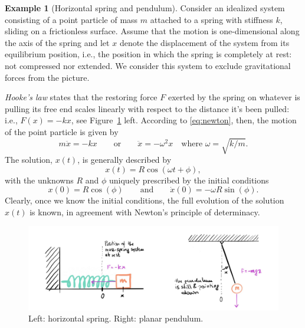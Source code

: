 \documentclass[english,fontsize=11pt,paper=b5]{scrbook}
\theoremstyle{definition}
\newtheorem{example}{Example}[chapter]
\begin{document}
  \begin{example}[Horizontal spring and pendulum]\label{ex:sprPen}
    Consider an idealized system consisting of a point particle of mass $m$ attached to a spring with stiffness $k$, sliding on a frictionless surface.
    Assume that the motion is one-dimensional along the axis of the spring and let $x$ denote the displacement of the system from its equilibrium position, i.e., the position in which the spring is completely at rest: not compressed nor extended. We consider this system to exclude gravitational forces from the picture.

    \emph{Hooke's law} states that the restoring force $F$ exerted by the spring on whatever is pulling its free end scales linearly with respect to the distance it's been pulled: i.e., $F(x) = - k x$, see Figure~\ref{fig:spring-pendulum} left. According to \eqref{eq:newton}, then, the motion of the point particle is given by
    \begin{equation}\label{eq:spring}
      m \ddot{x} = - k x \qquad\mbox{or}\qquad \ddot{x} = - \omega^2 x \quad\mbox{where } \omega = \sqrt{k/m}.
    \end{equation}
    The solution, $x(t)$, is generally described by
    \begin{equation}\label{eq:springsol}
      x(t) = R \cos(\omega t + \phi),
    \end{equation} with the unknowns $R$ and $\phi$ uniquely prescribed by the initial conditions
    \begin{equation}
      x(0) = R\cos(\phi) \qquad\mbox{and}\qquad \dot x(0) = -\omega R \sin(\phi).
    \end{equation}
    Clearly, once we know the initial conditions, the full evolution of the solution $x(t)$ is known, in agreement with Newton's principle of determinacy. \medskip

    \begin{figure}[ht!]
      \centering
      \includegraphics[width=.9\linewidth]{images/HM-1-2.pdf}
      \caption{Left: horizontal spring. Right: planar pendulum.}%
      \label{fig:spring-pendulum}
    \end{figure}


\end{example}
\end{document}
